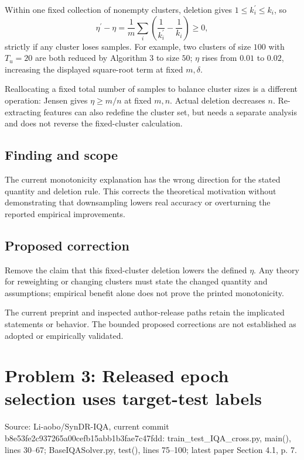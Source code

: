 \documentclass[11pt]{article}
\begin{document}
Within one fixed collection of nonempty clusters, deletion gives \(1\le k_i^{\prime}\le k_i\), so \[\eta^{\prime}-\eta=\frac1m\sum_i\left(\frac1{k_i^{\prime}}-\frac1{k_i}\right)\ge0,\] strictly if any cluster loses samples. For example, two clusters of size \(100\) with \(T_u=20\) are both reduced by Algorithm 3 to size \(50\); \(\eta\) rises from \(0.01\) to \(0.02\), increasing the displayed square-root term at fixed \(m,\delta\).

Reallocating a fixed total number of samples to balance cluster sizes is a different operation: Jensen gives \(\eta\ge m/n\) at fixed \(m,n\). Actual deletion decreases \(n\). Re-extracting features can also redefine the cluster set, but needs a separate analysis and does not reverse the fixed-cluster calculation.

\subsection*{Finding and scope}

The current monotonicity explanation has the wrong direction for the stated quantity and deletion rule. This corrects the theoretical motivation without demonstrating that downsampling lowers real accuracy or overturning the reported empirical improvements.

\subsection*{Proposed correction}

Remove the claim that this fixed-cluster deletion lowers the defined \(\eta\). Any theory for reweighting or changing clusters must state the changed quantity and assumptions; empirical benefit alone does not prove the printed monotonicity.

The current preprint and inspected author-release paths retain the implicated statements or behavior. The bounded proposed corrections are not established as adopted or empirically validated.

\section*{Problem 3: Released epoch selection uses target-test labels}

Source: Li-aobo/SynDR-IQA, current commit b8e53fe2c937265a00cefb15abb1b3fae7c47fdd: train\_test\_IQA\_cross.py, main(), lines 30–67; BaseIQASolver.py, test(), lines 75–100; latest paper Section 4.1, p. 7.
\end{document}
